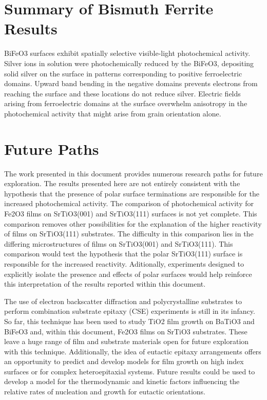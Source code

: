 \documentclass[12pt,%
              twoside,
               letterpaper]{uiothesis}
\begin{document}
\section{Summary of Bismuth Ferrite Results}
\label{sec:conclusions.bfo.summary}

BiFeO3 surfaces exhibit spatially selective visible-light photochemical activity.
Silver ions in solution were photochemically reduced by the BiFeO3, depositing solid
silver on the surface in patterns corresponding to positive ferroelectric domains. Upward
band bending in the negative domains prevents electrons from reaching the surface and
these locations do not reduce silver. Electric fields arising from ferroelectric domains
at the surface overwhelm anisotropy in the photochemical activity that might arise from
grain orientation alone.

\section{Future Paths}
\label{sec:conclusions.future.paths}

The work presented in this document provides numerous research paths for future
exploration. The results presented here are not entirely consistent with the hypothesis 
that the presence of
polar surface terminations are responsible for the increased photochemical activity. The
comparison of photochemical activity for Fe2O3 films on SrTiO3(001) and
SrTiO3(111) surfaces is not yet complete. This comparison removes other possibilities
for the explanation of the higher reactivity of films on SrTiO3(111) substrates. The
difficulty in this comparison lies in the differing microstructures of films on
SrTiO3(001) and SrTiO3(111). This comparison would test the hypothesis that the
polar SrTiO3(111) surface is responsible for the increased reactivity. Aditionally,
experiments designed to explicitly isolate the presence and effects of polar surfaces
would help reinforce this interpretation of the results reported within this document.

The use of electron backscatter diffraction  and polycrystalline substrates to perform
combination substrate epitaxy (CSE) experiments is still in its infancy. So far, this
technique has been used to study TiO2 film growth on BaTiO3 and BiFeO3 and,
within this document, Fe2O3 films on SrTiO3 substrates. These leave a huge
range of film and substrate materials open for future exploration with this technique.
Additionally, the idea of eutactic epitaxy arrangements offers an opportunity to predict
and develop models for film growth on high index surfaces or for complex heteroepitaxial
systems. Future results could be used to develop a model for the thermodynamic and kinetic
factors influencing the relative rates of nucleation and growth for eutactic orientations.
\end{document}
